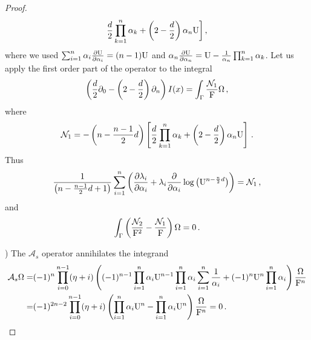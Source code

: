 \documentclass[11pt]{article}
\begin{document}
\begin{proof}
\begin{align}
\begin{split}
\frac{d}{2}\prod_{k=1}^{n} \alpha_{k} + \left( 2 - \frac{d}{2} \right) \alpha_{n} {\rm U}
\bigg] \,,
\end{split}
\end{align}
where we used $\sum_{i=1}^{n}\alpha_{i} \frac{\partial {\rm U}}{\partial \alpha_{i}} = (n-1) {\rm U}$ and $\alpha_{n}\frac{\partial {\rm U}}{\partial \alpha_{n}} = {\rm U} - \frac{1}{\alpha_{n}}\prod_{k=1}^{n}\alpha_{k}$. 
Let us apply the first order part of the operator to the integral
\begin{align}
\left( \frac{d}{2} \partial_{0} - \left( 2 - \frac{d}{2} \right) \partial_{n} \right) I(x) = \int_{\Gamma} \frac{\mathcal{N}_{1}}{{\rm F}} \Omega \,, 
\end{align}
where
\begin{align}
\mathcal{N}_{1} = - \left( n - \frac{n-1}{2}d \right) \left[
\frac{d}{2} \prod_{k=1}^{n} \alpha_{k} + \left( 2-\frac{d}{2} \right)\alpha_{n} {\rm U}
\right] \,.
\end{align}
Thus
\begin{align}
\frac{1}{\left( n -\frac{n-1}{2}d +1 \right)}\sum_{i=1}^{n} \left( \frac{\partial \lambda_{i}}{\partial \alpha_{i}} + \lambda_{i} \frac{\partial}{\partial \alpha_{i}} \log\left( {\rm U}^{n - \frac{n}{2}d}\right) \right) = \mathcal{N}_{1} \,,   
\end{align}
and
\begin{align}
\int_{\Gamma} \left( \frac{\mathcal{N}_{2}}{{\rm F}^{2}} - \frac{\mathcal{N}_{1}}{{\rm F}} \right) \Omega  = 0 \,.   
\end{align}

) The $\mathcal{A}_{s}$ operator annihilates the integrand
\begin{align}
\begin{split}
\mathcal{A}_{s} \Omega =& (-1)^{n} \prod_{i=0}^{n-1}(\eta + i) \left( (-1)^{n-1}\prod_{i=1}^{n} \alpha_{i} {\rm U}^{n-1} \prod_{i=1}^{n}\alpha_{i}\sum_{i=1}^{n}\frac{1}{\alpha_{i}} + (-1)^{n} {\rm U}^{n} \prod_{i=1}^{n} \alpha_{i} \right) \frac{\Omega}{{\rm F}^{n}}  \\
=&(-1)^{2n-2}\prod_{i=0}^{n-1}(\eta +i) \left( \prod_{i=1}^{n}\alpha_{i}{\rm U}^{n} - \prod_{i=1}^{n}\alpha_{i}{\rm U}^{n}  \right) \frac{\Omega}{{\rm F}^{n}} = 0 \,.
\end{split}
\end{align}
\end{proof}
\end{document}
